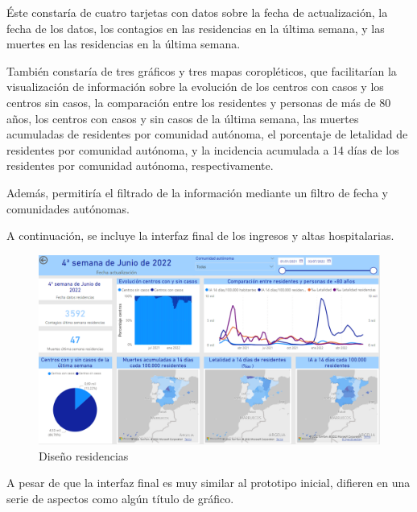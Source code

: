 Éste constaría de cuatro tarjetas con datos sobre la fecha de actualización, la fecha de los datos, los contagios en las residencias en la última semana, y las muertes en las residencias en la última semana. 

También constaría de tres gráficos y tres mapas coropléticos, que facilitarían la visualización de información sobre la evolución de los centros con casos y los centros sin casos, la comparación entre los residentes y personas de más de 80 años, los centros con casos y sin casos de la última semana, las muertes acumuladas de residentes  por comunidad autónoma, el porcentaje de letalidad de residentes por comunidad autónoma, y la incidencia acumulada a 14 días de los residentes por comunidad autónoma, respectivamente. 

Además, permitiría el filtrado de la información mediante un filtro de fecha y comunidades autónomas.

A continuación, se incluye la interfaz final de los ingresos y altas hospitalarias. 

\begin{figure}[h]
    \advance\leftskip-0.5cm 
    \includegraphics[scale=0.55]{img/powerBI_residencias.PNG}
    \caption{Diseño residencias}
\end{figure}

A pesar de que la interfaz final es muy similar al prototipo inicial, difieren en una serie de aspectos como algún título de gráfico.
